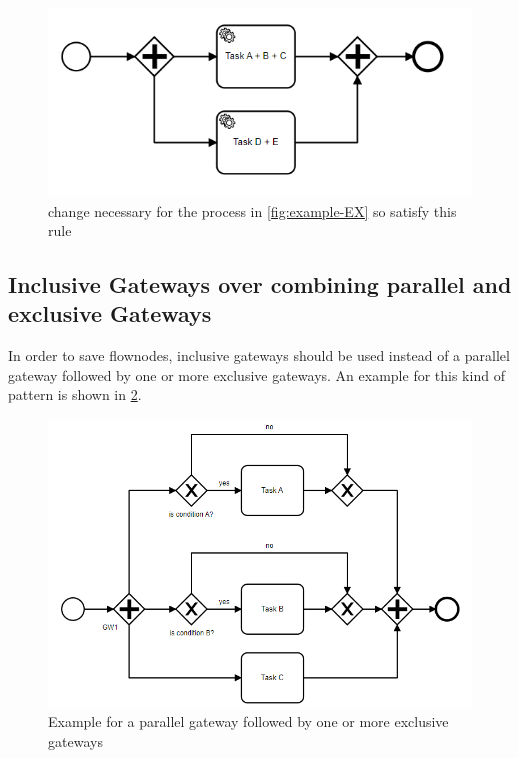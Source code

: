 \begin{figure}[H]
	\centering
	\includegraphics[width=0.7\columnwidth]{graphics/merge-suggestion-2}
	\caption{change necessary for the process in \ref{fig:example-EX} so satisfy this rule} 
	\label{fig:example-EX-fix} 
\end{figure}

\subsection{Inclusive Gateways over combining parallel and exclusive Gateways}
In order to save flownodes, inclusive gateways should be used instead of a parallel gateway followed by one or more exclusive gateways. An example for this kind of pattern is shown in \ref{fig:example-GW}.

\begin{figure}[H]
	\centering
	\includegraphics[width=0.9\columnwidth]{graphics/exclusive-suggestion-1}
	\caption{Example for a parallel gateway followed by one or more exclusive gateways} 
	\label{fig:example-GW} 
\end{figure}

